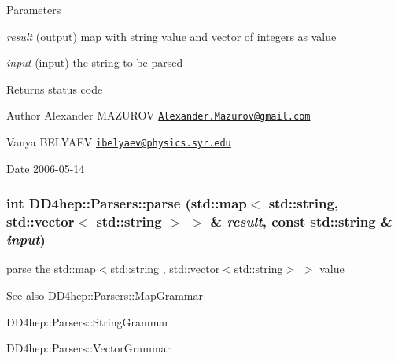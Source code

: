 \begin{DoxyParams}{Parameters}
\item[{\em result}](output) map with string value and vector of integers as value \item[{\em input}](input) the string to be parsed \end{DoxyParams}
\begin{DoxyReturn}{Returns}
status code
\end{DoxyReturn}
\begin{DoxyAuthor}{Author}
Alexander MAZUROV \href{mailto:Alexander.Mazurov@gmail.com}{\tt Alexander.Mazurov@gmail.com} 

Vanya BELYAEV \href{mailto:ibelyaev@physics.syr.edu}{\tt ibelyaev@physics.syr.edu} 
\end{DoxyAuthor}
\begin{DoxyDate}{Date}
2006-\/05-\/14 
\end{DoxyDate}
\hypertarget{namespace_d_d4hep_1_1_parsers_a010112afc7cbf060b08876d5d4dee7d5}{
\subsubsection[{parse}]{\setlength{\rightskip}{0pt plus 5cm}int DD4hep::Parsers::parse (std::map$<$ std::string, std::vector$<$ std::string $>$ $>$ \& {\em result}, \/  const std::string \& {\em input})}}
\label{namespace_d_d4hep_1_1_parsers_a010112afc7cbf060b08876d5d4dee7d5}


parse the {\ttfamily std::map$<$\hyperlink{classstd_1_1string}{std::string} , \hyperlink{classstd_1_1vector}{std::vector}$<$\hyperlink{classstd_1_1string}{std::string}$>$ $>$} value \begin{DoxySeeAlso}{See also}
DD4hep::Parsers::MapGrammar 

DD4hep::Parsers::StringGrammar 

DD4hep::Parsers::VectorGrammar 
\end{DoxySeeAlso}

